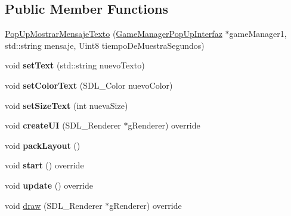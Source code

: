 \subsection*{Public Member Functions}
\begin{DoxyCompactItemize}
\item 
\hyperlink{class_pop_up_mostrar_mensaje_texto_aa6b0ff59f5d49aa7500b1a0416b0b854}{Pop\+Up\+Mostrar\+Mensaje\+Texto} (\hyperlink{class_game_manager_pop_up_interfaz}{Game\+Manager\+Pop\+Up\+Interfaz} $\ast$game\+Manager1, std\+::string mensaje, Uint8 tiempo\+De\+Muestra\+Segundos)
\item 
void {\bfseries set\+Text} (std\+::string nuevo\+Texto)\hypertarget{class_pop_up_mostrar_mensaje_texto_a53524c40d74ef454646d24bb1695f0aa}{}\label{class_pop_up_mostrar_mensaje_texto_a53524c40d74ef454646d24bb1695f0aa}

\item 
void {\bfseries set\+Color\+Text} (S\+D\+L\+\_\+\+Color nuevo\+Color)\hypertarget{class_pop_up_mostrar_mensaje_texto_a4b51dbcde0964297c4c334bdd10b8817}{}\label{class_pop_up_mostrar_mensaje_texto_a4b51dbcde0964297c4c334bdd10b8817}

\item 
void {\bfseries set\+Size\+Text} (int nueva\+Size)\hypertarget{class_pop_up_mostrar_mensaje_texto_ac17d66a42d42689f5ddbb447a643c88c}{}\label{class_pop_up_mostrar_mensaje_texto_ac17d66a42d42689f5ddbb447a643c88c}

\item 
void {\bfseries create\+UI} (S\+D\+L\+\_\+\+Renderer $\ast$g\+Renderer) override\hypertarget{class_pop_up_mostrar_mensaje_texto_a2879964b8559ecfcae7248fbde33e8e3}{}\label{class_pop_up_mostrar_mensaje_texto_a2879964b8559ecfcae7248fbde33e8e3}

\item 
void {\bfseries pack\+Layout} ()\hypertarget{class_pop_up_mostrar_mensaje_texto_a1bb00f3c31e204ed8d34982cd94378ac}{}\label{class_pop_up_mostrar_mensaje_texto_a1bb00f3c31e204ed8d34982cd94378ac}

\item 
void {\bfseries start} () override\hypertarget{class_pop_up_mostrar_mensaje_texto_a6f4894566c466929798c017db715712a}{}\label{class_pop_up_mostrar_mensaje_texto_a6f4894566c466929798c017db715712a}

\item 
void {\bfseries update} () override\hypertarget{class_pop_up_mostrar_mensaje_texto_ab3cad38fc330ca8ec83ac1dcbdde0fbd}{}\label{class_pop_up_mostrar_mensaje_texto_ab3cad38fc330ca8ec83ac1dcbdde0fbd}

\item 
void \hyperlink{class_pop_up_mostrar_mensaje_texto_a17f96444323a9694447b2cf279562414}{draw} (S\+D\+L\+\_\+\+Renderer $\ast$g\+Renderer) override
\end{DoxyCompactItemize}

